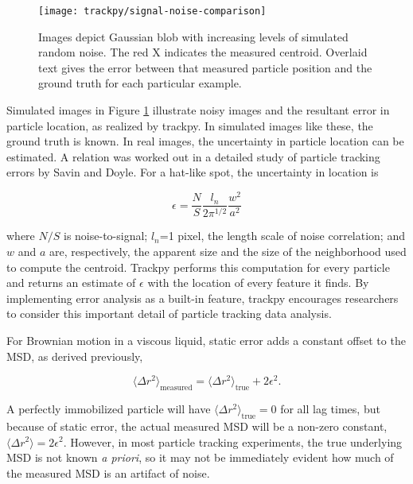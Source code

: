    \begin{figure}
    \centering
    \texttt{[image: trackpy/signal-noise-comparison]}
    \caption{\label{fig:static-error}Images depict Gaussian blob with increasing levels of simulated random noise. The red X indicates the measured centroid. Overlaid text gives the error between that measured particle position and the ground truth for each particular example.}
    \end{figure}
    
Simulated images in Figure \ref{fig:static-error} illustrate noisy images and the resultant error in particle location, as realized by trackpy. In simulated images like these, the ground truth is known. In real images, the uncertainty in particle location can be estimated. A relation was worked out in a detailed study of particle tracking errors by Savin and Doyle\cite{Savin2005}. For a hat-like spot, the uncertainty in location is

\begin{equation}
\epsilon = \frac{N}{S}\frac{l_n}{2\pi^{1/2}}\frac{w^2}{a^2}
\end{equation}

\noindent where $N/S$ is noise-to-signal; $l_n$=1 pixel, the length scale of noise correlation; and $w$ and $a$ are, respectively, the apparent size and the size of the neighborhood used to compute the centroid. Trackpy performs this computation for every particle and returns an estimate of $\epsilon$ with the location of every feature it finds. By implementing error analysis as a built-in feature, trackpy encourages researchers to consider this important detail of particle tracking data analysis.

For Brownian motion in a viscous liquid, static error adds a constant offset to the MSD, as derived previously\cite{Martin2002a},

\begin{equation}
\langle \Delta r^2 \rangle_{\text{measured}} = \langle \Delta r^2 \rangle_{\text{true}} + 2\epsilon^2.
\end{equation}

\noindent A perfectly immobilized particle will have $\langle\Delta r^2\rangle_{\text{true}} = 0$ for all lag times, but because of static error, the actual measured MSD will be a non-zero constant, $\langle \Delta r^2 \rangle = 2\epsilon^2$\cite{Martin2002a,Crocker2007}. However, in most particle tracking experiments, the true underlying MSD is not known \emph{a priori}, so it may not be immediately evident how much of the measured MSD is an artifact of noise.

